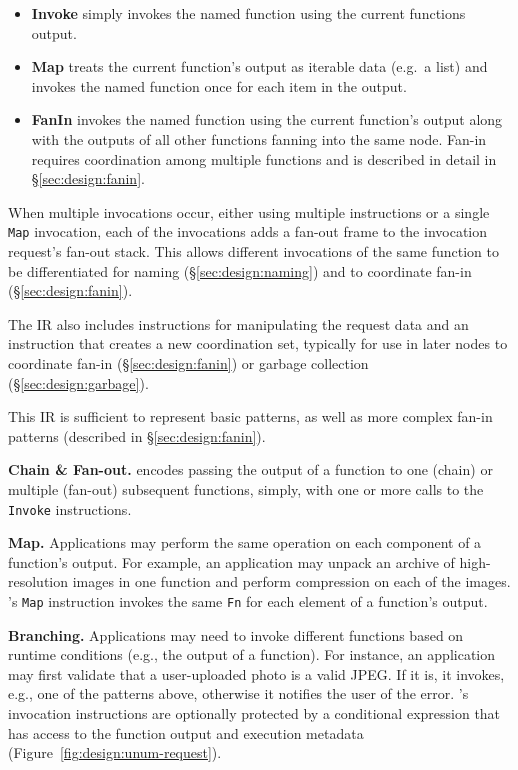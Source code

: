 \begin{itemize}
  \item \textbf{Invoke} simply invokes the named function using the
        current functions output.
  \item \textbf{Map} treats the current function's output as iterable data
        (e.g.\ a list) and invokes the named function once for each item in the
        output.
  \item \textbf{FanIn} invokes the named function using the current function's
        output along with the outputs of all other functions fanning into the
        same node. Fan-in requires coordination among multiple functions and is
        described in detail in \S\ref{sec:design:fanin}.
\end{itemize}

When multiple invocations occur, either using multiple instructions or a single
\texttt{Map} invocation, each of the invocations adds a fan-out frame to the
invocation request's fan-out stack. This allows different invocations of the
same function to be differentiated for naming (\S\ref{sec:design:naming}) and to
coordinate fan-in (\S\ref{sec:design:fanin}).

The IR also includes instructions for manipulating the \name{} request data and
an instruction that creates a new coordination set, typically for use in later
nodes to coordinate fan-in (\S\ref{sec:design:fanin}) or garbage collection
(\S\ref{sec:design:garbage}).

This IR is sufficient to represent basic patterns, as well as more complex
fan-in patterns (described in \S\ref{sec:design:fanin}).

\textbf{Chain \& Fan-out.} \name{} encodes passing the output of a function to
one (chain) or multiple (fan-out) subsequent functions, simply, with one or
more calls to the \texttt{Invoke} instructions.

\textbf{Map.} Applications may perform the same operation on each component of
a function's output. For example, an application may unpack an archive of
high-resolution images in one function and perform compression on each of the
images. \name{}'s \texttt{Map} instruction invokes the same \texttt{Fn} for
each element of a function's output.

\textbf{Branching.}
Applications may need to invoke different functions based on runtime conditions
(e.g., the output of a function). For instance, an application may first
validate that a user-uploaded photo is a valid JPEG. If it is, it invokes, e.g.,
one of the patterns above, otherwise it notifies the user of the error.
\name{}'s invocation instructions are optionally protected by a conditional
expression that has access to the function output and execution metadata
(Figure~\ref{fig:design:unum-request}).




